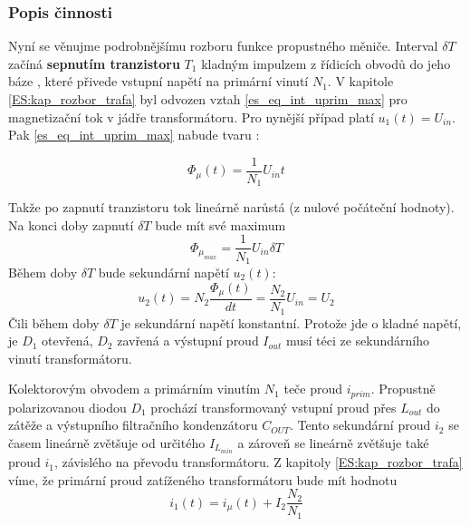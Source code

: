       \newpage
    \subsubsection{Popis činnosti}\label{ENZ:kap_forward_converter_describe}
      Nyní se věnujme podrobnějšímu rozboru funkce propustného měniče. Interval $\delta T$ začíná
      \textbf{sepnutím tranzistoru} $T_1$ kladným impulzem z řídicích obvodů do jeho báze     
      \cite[s.~131]{Hammembauer}, které přivede vstupní napětí na primární vinutí $N_1$. V kapitole
      \ref{ES:kap_rozbor_trafa} byl odvozen vztah \ref{es_eq_int_uprim_max} pro magnetizační tok v 
      jádře transformátoru. Pro nynější případ platí $u_1(t) = U_{in}$. Pak 
      \ref{es_eq_int_uprim_max} nabude tvaru 
      \cite[s.~104]{Patocka}:
      
      \begin{equation}\label{ENZ:eq_forward_phi_mag}
       \Phi_\mu(t)=\frac{1}{N_1}U_{in}t
      \end{equation}
      
      Takže po zapnutí tranzistoru tok lineárně narůstá (z nulové počáteční hodnoty). Na konci doby 
      zapnutí $\delta T$ bude mít své maximum 
      \begin{equation}\label{ENZ:eq_forward_phi_max}
       \Phi_{\mu_{max}}=\frac{1}{N_1}U_{in}\delta T
      \end{equation}
      Během doby $\delta T$ bude sekundární napětí $u_{2}(t)$:
      \begin{equation}\label{ENZ:eq_forward_usec}
       u_{2}(t) = N_2\frac{\Phi_\mu(t)}{dt} = \frac{N_2}{N_1}U_{in} = U_{2}
      \end{equation}
      Čili během doby $\delta T$ je sekundární napětí konstantní. Protože jde o kladné napětí, je 
      $D_1$ otevřená, $D_2$ zavřená a výstupní proud $I_{out}$ musí téci ze sekundárního vinutí 
      transformátoru.
      
      Kolektorovým obvodem a primárním vinutím $N_1$ teče proud $i_{prim}$. Propustně polarizovanou 
      diodou $D_1$ prochází transformovaný vstupní proud přes $L_{out}$ do zátěže a výstupního 
      filtračního kondenzátoru $C_{OUT}$. Tento sekundární proud $i_2$ se časem lineárně zvětšuje od 
      určitého $I_{L_{min}}$ a zároveň se lineárně zvětšuje také proud $i_1$, závislého na převodu 
      transformátoru. Z kapitoly \ref{ES:kap_rozbor_trafa} víme, že primární proud zatíženého 
      transformátoru bude mít hodnotu
      \begin{equation}\label{ENZ:eq_forward_iprim}
      i_1(t) = i_\mu(t) + I_2\frac{N_2}{N_1}
      \end{equation} 
      
